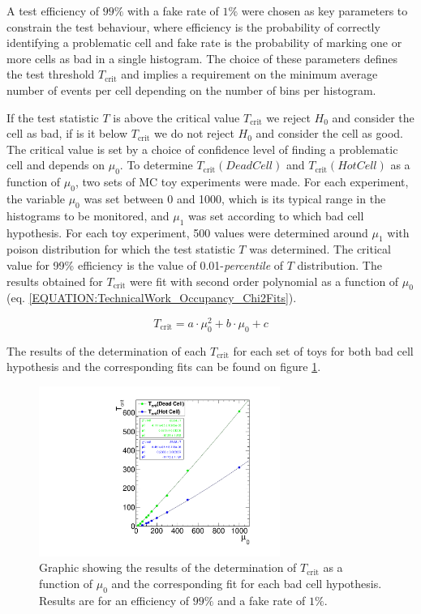 A test efficiency of $99\%$ with a fake rate of $1\%$ were chosen as key parameters to constrain the test behaviour, where efficiency is the probability of correctly identifying a problematic cell and fake rate is the probability of marking one or more cells as bad in a single histogram. The choice of these parameters defines the test threshold $T_{\text{crit}}$ and implies a requirement on the minimum average number of events per cell depending on the number of bins per histogram.

If the test statistic $T$ is above the critical value $T_{\text{crit}}$ we reject $H_0$ and consider the cell as bad, if is it below $T_{\text{crit}}$ we do not reject $H_0$ and consider the cell as good. The critical value is set by a choice of confidence level of finding a problematic cell and depends on $\mu_0$. To determine $T_{\text{crit}}(Dead Cell)$ and $T_{\text{crit}}(Hot Cell)$ as a function of $\mu_0$, two sets of \gls{MC} toy experiments were made. For each experiment, the variable $\mu_0$ was set between 0 and 1000, which is its typical range in the histograms to be monitored, and $\mu_1$ was set according to which bad cell hypothesis. For each toy experiment, 500 values were determined around $\mu_1$ with poison distribution for which the test statistic $T$ was determined. The critical value for 99\% efficiency is the value of 0.01-\textit{percentile} of $T$ distribution. The results obtained for $T_{\text{crit}}$ were fit with second order polynomial as a function of $\mu_0$ (eq. \ref{EQUATION:TechnicalWork_Occupancy_Chi2Fits}).

\begin{equation}
T_{\text{crit}}=a \cdot \mu_0^2 + b \cdot \mu_0 + c
\label{EQUATION:TechnicalWork_Occupancy_Chi2Fits}
\end{equation}

The results of the determination of each $T_{\text{crit}}$ for each set of toys for both bad cell hypothesis and the corresponding fits can be found on figure \ref{FIGURE:TechnicalWork_L1TOccupancyTCrit}.

\begin{figure}[!htb]
\centering
\includegraphics[width=0.70\textwidth]{Chapter03/L1TOnline/Images/L1TOccupancy_TCrit.pdf}
\caption{Graphic showing the results of the determination of $T_{\text{crit}}$ as a function of $\mu_0$ and the corresponding fit for each bad cell hypothesis. Results are for an efficiency of $99\%$ and a fake rate of $1\%$.}
\label{FIGURE:TechnicalWork_L1TOccupancyTCrit}
\end{figure}

